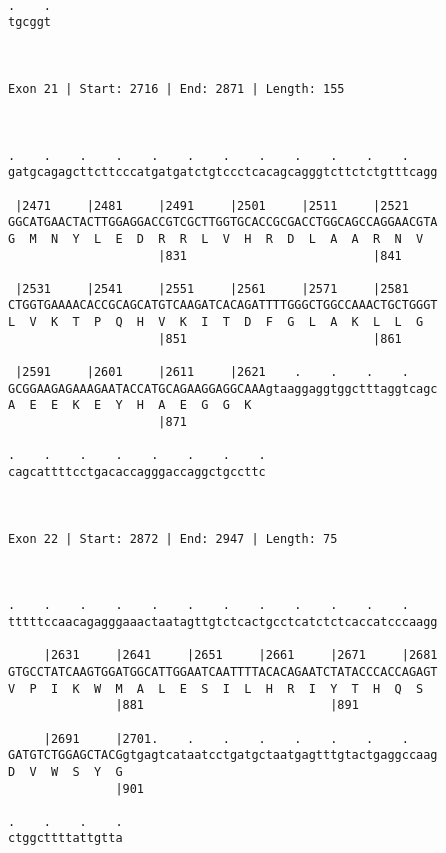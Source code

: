 \documentclass{article}
\begin{document}
{\begin{Verbatim}
  
.    .
tgcggt
      
      
 
Exon 21 | Start: 2716 | End: 2871 | Length: 155



.    .    .    .    .    .    .    .    .    .    .    .    
gatgcagagcttcttcccatgatgatctgtccctcacagcagggtcttctctgtttcagg
                                                            
 |2471     |2481     |2491     |2501     |2511     |2521    
GGCATGAACTACTTGGAGGACCGTCGCTTGGTGCACCGCGACCTGGCAGCCAGGAACGTA
G  M  N  Y  L  E  D  R  R  L  V  H  R  D  L  A  A  R  N  V  
                     |831                          |841     
  
 |2531     |2541     |2551     |2561     |2571     |2581    
CTGGTGAAAACACCGCAGCATGTCAAGATCACAGATTTTGGGCTGGCCAAACTGCTGGGT
L  V  K  T  P  Q  H  V  K  I  T  D  F  G  L  A  K  L  L  G  
                     |851                          |861     
  
 |2591     |2601     |2611     |2621    .    .    .    .    
GCGGAAGAGAAAGAATACCATGCAGAAGGAGGCAAAgtaaggaggtggctttaggtcagc
A  E  E  K  E  Y  H  A  E  G  G  K                          
                     |871                                   
  
.    .    .    .    .    .    .    .
cagcattttcctgacaccagggaccaggctgccttc
                                    
                                    
 
Exon 22 | Start: 2872 | End: 2947 | Length: 75



.    .    .    .    .    .    .    .    .    .    .    .    
tttttccaacagagggaaactaatagttgtctcactgcctcatctctcaccatcccaagg
                                                            
     |2631     |2641     |2651     |2661     |2671     |2681
GTGCCTATCAAGTGGATGGCATTGGAATCAATTTTACACAGAATCTATACCCACCAGAGT
V  P  I  K  W  M  A  L  E  S  I  L  H  R  I  Y  T  H  Q  S  
               |881                          |891           
  
     |2691     |2701.    .    .    .    .    .    .    .    
GATGTCTGGAGCTACGgtgagtcataatcctgatgctaatgagtttgtactgaggccaag
D  V  W  S  Y  G                                            
               |901                                         
  
.    .    .    .
ctggcttttattgtta
                
                
 

\end{Verbatim}}
\end{document}

